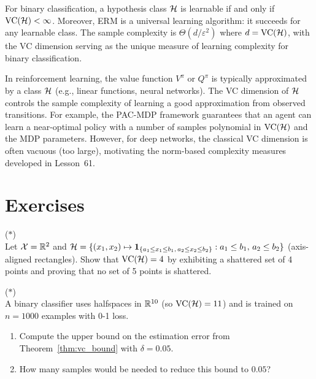 \documentclass[11pt,a4paper]{article}
\begin{document}
\begin{keyresult}[title={Fundamental Theorem of Statistical Learning}]
For binary classification, a hypothesis class $\mathcal{H}$ is learnable
if and only if $\operatorname{VC}(\mathcal{H}) < \infty$.  Moreover, ERM is a
universal learning algorithm: it succeeds for any learnable class.
The sample complexity is $\Theta(d/\varepsilon^2)$ where
$d = \operatorname{VC}(\mathcal{H})$, with the VC dimension serving as the unique
measure of learning complexity for binary classification.
\end{keyresult}

\begin{rlconnection}[title={VC Theory and RL Function Approximation}]
In reinforcement learning, the value function $V^\pi$ or $Q^\pi$ is
typically approximated by a class $\mathcal{H}$ (e.g., linear functions,
neural networks).  The VC dimension of $\mathcal{H}$ controls the sample
complexity of learning a good approximation from observed transitions.
For example, the PAC-MDP framework guarantees that an agent can
learn a near-optimal policy with a number of samples polynomial in
$\operatorname{VC}(\mathcal{H})$ and the MDP parameters.  However, for deep networks,
the classical VC dimension is often vacuous (too large), motivating
the norm-based complexity measures developed in Lesson~61.
\end{rlconnection}


\section{Exercises}
\label{sec:exercises}

\begin{exercise}
\textnormal{(\(\ast\))} \\
Let $\mathcal{X} = \mathbb{R}^2$ and $\mathcal{H} = \{(x_1, x_2) \mapsto
\mathbf{1}_{\{a_1 \leq x_1 \leq b_1, \, a_2 \leq x_2 \leq b_2\}} :
a_1 \leq b_1, \, a_2 \leq b_2\}$ (axis-aligned rectangles).
Show that $\operatorname{VC}(\mathcal{H}) = 4$ by exhibiting a shattered set of 4
points and proving that no set of 5 points is shattered.
\end{exercise}

\begin{exercise}
\textnormal{(\(\ast\))} \\
A binary classifier uses halfspaces in $\mathbb{R}^{10}$ (so
$\operatorname{VC}(\mathcal{H}) = 11$) and is trained on $n = 1000$ examples with
0-1 loss.
\begin{enumerate}[nosep,label=(\alph*)]
    \item Compute the upper bound on the estimation error from
    Theorem~\ref{thm:vc_bound} with $\delta = 0.05$.
    \item How many samples would be needed to reduce this bound
    to $0.05$?
\end{enumerate}
\end{exercise}
\end{document}

